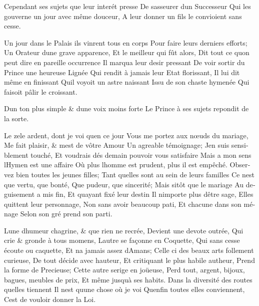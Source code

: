 \documentclass[14pt,a4paper]{memoir}
\begin{document}
\begin{otherlanguage}{french}
{Cependant ses sujets que leur interét presse} {De
s\textquotesingle asseurer d\textquotesingle un Successeur} {Qui les
gouverne un jour avec même douceur,} {A leur donner un fils le
convioient sans cesse. }

{Un jour dans le Palais ils vinrent tous en corps } {Pour faire leurs
derniers efforts;} {Un Orateur d\textquotesingle une grave apparence,}
{Et le meilleur qui fût alors,} {Dit tout ce qu\textquotesingle on peut
dire en pareille occurrence} {Il marqua leur desir pressant} {De voir
sortir du Prince une heureuse Lignée} {Qui rendit à jamais leur Etat
florissant,} {Il lui dit même en finissant} {Qu\textquotesingle il
voyoit un astre naissant} {Issu de son chaste hymenée} {Qui faisoit
pâlir le croissant.}

{D\textquotesingle un ton plus simple \& d\textquotesingle une voix
moins forte } {Le Prince à ses sujets repondit de la sorte.}

{Le zele ardent, dont je voi qu\textquotesingle en ce jour} {Vous me
portez aux nœuds du mariage,} {Me fait plaisir, \& m\textquotesingle est
de vôtre Amour} {Un agreable témoignage;} {J\textquotesingle en suis
sensiblement touché,} {Et voudrais dés demain pouvoir vous satisfaire}
{Mais a mon sens l\textquotesingle Hymen est une affaire} {Où plus
l\textquotesingle homme est prudent, plus il est empêché. } {Observez
bien toutes les jeunes filles;} {Tant qu\textquotesingle elles sont au
sein de leurs familles} {Ce n\textquotesingle est que vertu, que bonté,}
{Que pudeur, que sincerité;} {Mais sitôt que le mariage} {Au deguisement
a mis fin,} {Et qu\textquotesingle ayant fixé leur destin} {Il
n\textquotesingle importe plus d\textquotesingle être sage,} {Elles
quittent leur personnage,} {Non sans avoir beaucoup pati,} {Et chacune
dans son ménage} {Selon son gré prend son parti.}

{L\textquotesingle une d\textquotesingle humeur chagrine, \& que rien ne
recrée,} {Devient une devote outrée,} {Qui crie \& gronde à tous
momens,} {L\textquotesingle autre se façonne en Coquette,} {Qui sans
cesse écoute ou caquette,} {Et n\textquotesingle a jamais assez
d\textquotesingle Amans;} {Celle ci des beaux arts follement curieuse,}
{De tout décide avec hauteur,} {Et critiquant le plus habile autheur,}
{Prend la forme de Precieuse;} {Cette autre s\textquotesingle erige en
joüeuse,} {Perd tout, argent, bijoux, bagues, meubles de prix,} {Et même
jusqu\textquotesingle à ses habits.} {Dans la diversité des routes
qu\textquotesingle elles tiennent} {Il n\textquotesingle est
qu\textquotesingle une chose où je voi} {Qu\textquotesingle enfin toutes
elles conviennent,} {C\textquotesingle est de vouloir donner la Loi.}


\end{otherlanguage}
\end{document}
